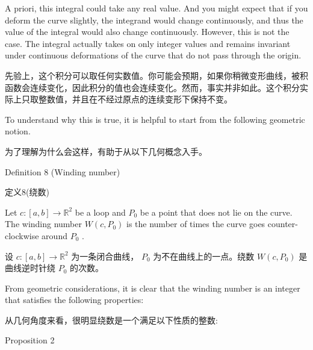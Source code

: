 A priori, this integral could take any real value. And you might expect that if you deform the curve slightly, the integrand would change continuously, and thus the value of the integral would also change continuously. However, this is not the case. The integral actually takes on only integer values and remains invariant under continuous deformations of the curve that do not pass through the origin.

\begin{tcolorbox}
先验上，这个积分可以取任何实数值。你可能会预期，如果你稍微变形曲线，被积函数会连续变化，因此积分的值也会连续变化。然而，事实并非如此。这个积分实际上只取整数值，并且在不经过原点的连续变形下保持不变。
\end{tcolorbox}

To understand why this is true, it is helpful to start from the following geometric notion.

\begin{tcolorbox}
为了理解为什么会这样，有助于从以下几何概念入手。
\end{tcolorbox}

\HRule

Definition 8 (Winding number)

\begin{tcolorbox}
定义8(绕数)
\end{tcolorbox}

\HRule

Let \(c : \left\lbrack  {a,b}\right\rbrack   \rightarrow  {\mathbb{R}}^{2}\) be a loop and \({P}_{0}\) be a point that does not lie on the curve. The winding number \(W\left( {c,{P}_{0}}\right)\) is the number of times the curve goes counter-clockwise around \({P}_{0}\) .

\begin{tcolorbox}
设 \(c : \left\lbrack  {a,b}\right\rbrack   \rightarrow  {\mathbb{R}}^{2}\) 为一条闭合曲线， \({P}_{0}\) 为不在曲线上的一点。绕数 \(W\left( {c,{P}_{0}}\right)\) 是曲线逆时针绕 \({P}_{0}\) 的次数。
\end{tcolorbox}

From geometric considerations, it is clear that the winding number is an integer that satisfies the following properties:

\begin{tcolorbox}
从几何角度来看，很明显绕数是一个满足以下性质的整数:
\end{tcolorbox}

\HRule

Proposition 2

